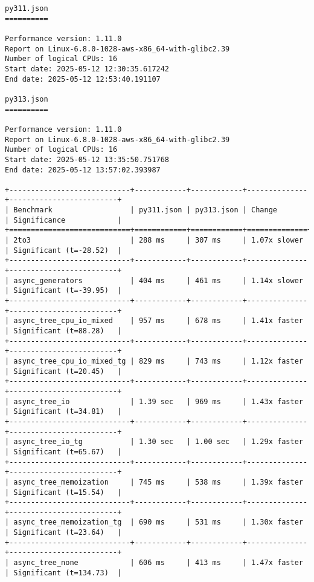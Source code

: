 \begin{code}
    \begin{verbatim}
py311.json
==========

Performance version: 1.11.0
Report on Linux-6.8.0-1028-aws-x86_64-with-glibc2.39
Number of logical CPUs: 16
Start date: 2025-05-12 12:30:35.617242
End date: 2025-05-12 12:53:40.191107

py313.json
==========

Performance version: 1.11.0
Report on Linux-6.8.0-1028-aws-x86_64-with-glibc2.39
Number of logical CPUs: 16
Start date: 2025-05-12 13:35:50.751768
End date: 2025-05-12 13:57:02.393987

+----------------------------+------------+------------+--------------+-------------------------+
| Benchmark                  | py311.json | py313.json | Change       | Significance            |
+============================+============+============+==============+=========================+
| 2to3                       | 288 ms     | 307 ms     | 1.07x slower | Significant (t=-28.52)  |
+----------------------------+------------+------------+--------------+-------------------------+
| async_generators           | 404 ms     | 461 ms     | 1.14x slower | Significant (t=-39.95)  |
+----------------------------+------------+------------+--------------+-------------------------+
| async_tree_cpu_io_mixed    | 957 ms     | 678 ms     | 1.41x faster | Significant (t=88.28)   |
+----------------------------+------------+------------+--------------+-------------------------+
| async_tree_cpu_io_mixed_tg | 829 ms     | 743 ms     | 1.12x faster | Significant (t=20.45)   |
+----------------------------+------------+------------+--------------+-------------------------+
| async_tree_io              | 1.39 sec   | 969 ms     | 1.43x faster | Significant (t=34.81)   |
+----------------------------+------------+------------+--------------+-------------------------+
| async_tree_io_tg           | 1.30 sec   | 1.00 sec   | 1.29x faster | Significant (t=65.67)   |
+----------------------------+------------+------------+--------------+-------------------------+
| async_tree_memoization     | 745 ms     | 538 ms     | 1.39x faster | Significant (t=15.54)   |
+----------------------------+------------+------------+--------------+-------------------------+
| async_tree_memoization_tg  | 690 ms     | 531 ms     | 1.30x faster | Significant (t=23.64)   |
+----------------------------+------------+------------+--------------+-------------------------+
| async_tree_none            | 606 ms     | 413 ms     | 1.47x faster | Significant (t=134.73)  |

\end{verbatim}
\end{code}
